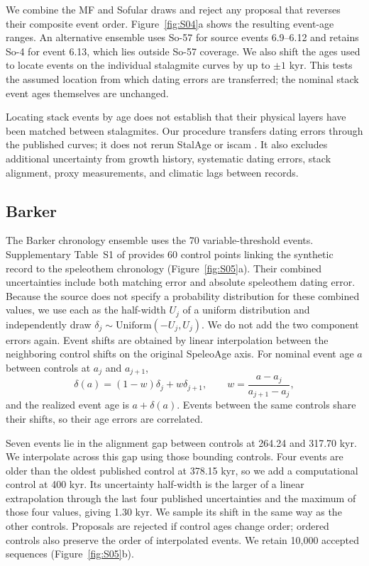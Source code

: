 \documentclass[11pt]{article}
\begin{document}
We combine the MF and Sofular draws and reject any proposal that reverses their composite event order. Figure~\ref{fig:S04}a shows the resulting event-age ranges. An alternative ensemble uses So-57 for source events 6.9--6.12 and retains So-4 for event 6.13, which lies outside So-57 coverage. We also shift the ages used to locate events on the individual stalagmite curves by up to $\pm1$ kyr. This tests the assumed location from which dating errors are transferred; the nominal stack event ages themselves are unchanged.

Locating stack events by age does not establish that their physical layers have been matched between stalagmites. Our procedure transfers dating errors through the published curves; it does not rerun StalAge or iscam \citep{scholz2011stalage,fohlmeister2012statistical}. It also excludes additional uncertainty from growth history, systematic dating errors, stack alignment, proxy measurements, and climatic lags between records.

\subsection*{Barker}

The Barker chronology ensemble uses the 70 variable-threshold events. Supplementary Table~S1 of \citet{barker2011800} provides 60 control points linking the synthetic record to the speleothem chronology (Figure~\ref{fig:S05}a). Their combined uncertainties include both matching error and absolute speleothem dating error. Because the source does not specify a probability distribution for these combined values, we use each as the half-width $U_j$ of a uniform distribution and independently draw $\delta_j\sim\mathrm{Uniform}(-U_j,U_j)$. We do not add the two component errors again. Event shifts are obtained by linear interpolation between the neighboring control shifts on the original SpeleoAge axis. For nominal event age $a$ between controls at $a_j$ and $a_{j+1}$,
\begin{equation}
 \delta(a)=(1-w)\delta_j+w\delta_{j+1},\qquad
 w=\frac{a-a_j}{a_{j+1}-a_j},
\end{equation}
and the realized event age is $a+\delta(a)$. Events between the same controls share their shifts, so their age errors are correlated.

Seven events lie in the alignment gap between controls at 264.24 and 317.70 kyr. We interpolate across this gap using those bounding controls. Four events are older than the oldest published control at 378.15 kyr, so we add a computational control at 400 kyr. Its uncertainty half-width is the larger of a linear extrapolation through the last four published uncertainties and the maximum of those four values, giving 1.30 kyr. We sample its shift in the same way as the other controls. Proposals are rejected if control ages change order; ordered controls also preserve the order of interpolated events. We retain 10,000 accepted sequences (Figure~\ref{fig:S05}b).
\end{document}
